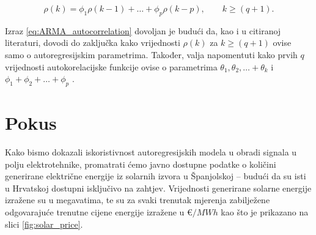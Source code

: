 \documentclass[a4paper,12pt,oneside]{memoir}
\begin{document}
            \begin{equation}
                \rho(k)=\phi_1\rho(k-1)+\ldots+\phi_p\rho(k-p), \quad \quad k\geq(q+1).
                \label{eq:ARMA_autocorrelation}
            \end{equation}

            Izraz \eqref{eq:ARMA_autocorrelation} dovoljan je budući da, kao i u citiranoj literaturi, dovodi do zaključka kako vrijednosti $\rho(k)$ za $ k\geq(q+1)$ ovise samo o autoregresijskim parametrima. Također, valja napomentuti kako prvih $q$ vrijednosti autokorelacijske funkcije ovise o parametrima $\theta_1,\theta_2,\ldots+\theta_k$ i $\phi_1+\phi_2+\ldots+\phi_p$ \cite{Bahovec}.
    \chapter{Pokus}
        Kako bismo dokazali iskoristivnost autoregresijskih modela u obradi signala u polju elektrotehnike, promatrati ćemo javno dostupne podatke o količini generirane električne energije iz solarnih izvora u Španjolskoj -- budući da su isti u Hrvatskoj dostupni isključivo na zahtjev. Vrijednosti generirane solarne energije izražene su u megavatima, te su za svaki trenutak mjerenja zabilježene odgovarajuće trenutne cijene energije izražene u $\text{€}/MWh$ kao što je prikazano na slici \ref{fig:solar_price}.
\end{document}
